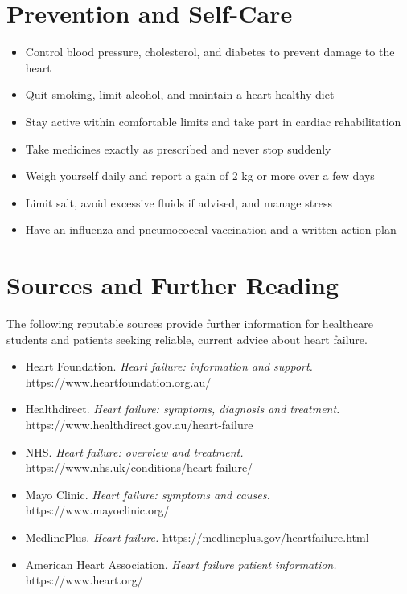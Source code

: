 \section*{Prevention and Self-Care}
\begin{itemize}
    \item Control blood pressure, cholesterol, and diabetes to prevent damage to the heart
    \item Quit smoking, limit alcohol, and maintain a heart-healthy diet
    \item Stay active within comfortable limits and take part in cardiac rehabilitation
    \item Take medicines exactly as prescribed and never stop suddenly
    \item Weigh yourself daily and report a gain of 2 kg or more over a few days
    \item Limit salt, avoid excessive fluids if advised, and manage stress
    \item Have an influenza and pneumococcal vaccination and a written action plan
\end{itemize}

\section*{Sources and Further Reading}
The following reputable sources provide further information for healthcare students and patients seeking reliable, current advice about heart failure.

\begin{itemize}
    \item Heart Foundation. \textit{Heart failure: information and support.} https://www.heartfoundation.org.au/
    \item Healthdirect. \textit{Heart failure: symptoms, diagnosis and treatment.} https://www.healthdirect.gov.au/heart-failure
    \item NHS. \textit{Heart failure: overview and treatment.} https://www.nhs.uk/conditions/heart-failure/
    \item Mayo Clinic. \textit{Heart failure: symptoms and causes.} https://www.mayoclinic.org/
    \item MedlinePlus. \textit{Heart failure.} https://medlineplus.gov/heartfailure.html
    \item American Heart Association. \textit{Heart failure patient information.} https://www.heart.org/
\end{itemize}
